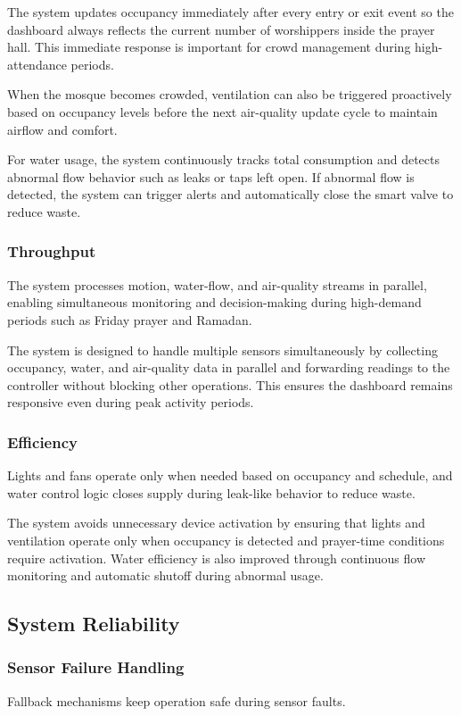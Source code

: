 The system updates occupancy immediately after every entry or exit event so the dashboard always reflects the current number of worshippers inside the prayer hall. This immediate response is important for crowd management during high-attendance periods.

When the mosque becomes crowded, ventilation can also be triggered proactively based on occupancy levels before the next air-quality update cycle to maintain airflow and comfort.

For water usage, the system continuously tracks total consumption and detects abnormal flow behavior such as leaks or taps left open. If abnormal flow is detected, the system can trigger alerts and automatically close the smart valve to reduce waste.

\subsubsection{Throughput}
The system processes motion, water-flow, and air-quality streams in parallel, enabling simultaneous monitoring and decision-making during high-demand periods such as Friday prayer and Ramadan.

The system is designed to handle multiple sensors simultaneously by collecting occupancy, water, and air-quality data in parallel and forwarding readings to the controller without blocking other operations. This ensures the dashboard remains responsive even during peak activity periods.

\subsubsection{Efficiency}
Lights and fans operate only when needed based on occupancy and schedule, and water control logic closes supply during leak-like behavior to reduce waste.

The system avoids unnecessary device activation by ensuring that lights and ventilation operate only when occupancy is detected and prayer-time conditions require activation. Water efficiency is also improved through continuous flow monitoring and automatic shutoff during abnormal usage.

\subsection{System Reliability}

\subsubsection{Sensor Failure Handling}
Fallback mechanisms keep operation safe during sensor faults.

